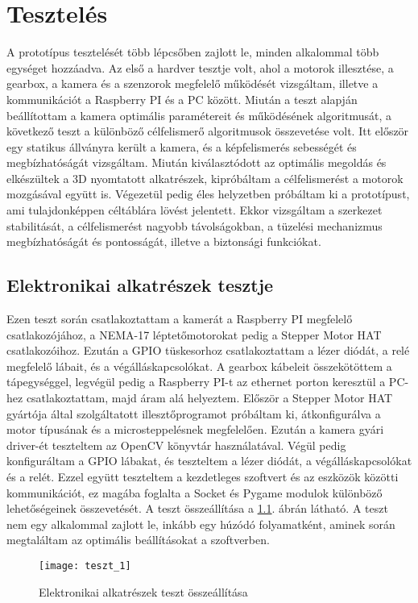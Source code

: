 \chapter{Tesztelés}
A prototípus tesztelését több lépcsőben zajlott le, minden alkalommal több egységet hozzáadva. Az első a hardver tesztje volt, ahol a motorok illesztése, a gearbox, a kamera és a szenzorok megfelelő működését vizsgáltam, illetve a kommunikációt a Raspberry PI és a PC között. Miután a teszt alapján beállítottam a kamera optimális paramétereit és működésének algoritmusát, a következő teszt a különböző célfelismerő algoritmusok összevetése volt. Itt először egy statikus állványra került a kamera, és a képfelismerés sebességét és megbízhatóságát vizsgáltam. Miután kiválasztódott az optimális megoldás és elkészültek a 3D nyomtatott alkatrészek, kipróbáltam a célfelismerést a motorok mozgásával együtt is. Végezetül pedig éles helyzetben próbáltam ki a prototípust, ami tulajdonképpen céltáblára lövést jelentett. Ekkor vizsgáltam a szerkezet stabilitását, a célfelismerést nagyobb távolságokban, a tüzelési mechanizmus megbízhatóságát és pontosságát, illetve a biztonsági funkciókat.

\section{Elektronikai alkatrészek tesztje}
Ezen teszt során csatlakoztattam a kamerát a Raspberry PI megfelelő csatlakozójához, a NEMA-17 léptetőmotorokat pedig a Stepper Motor HAT csatlakozóihoz. Ezután a GPIO tüskesorhoz csatlakoztattam a lézer diódát, a relé megfelelő lábait, és a végálláskapcsolókat. A gearbox kábeleit összekötöttem a tápegységgel, legvégül pedig a Raspberry PI-t az ethernet porton keresztül a PC-hez csatlakoztattam, majd áram alá helyeztem. Először a Stepper Motor HAT gyártója által szolgáltatott illesztőprogramot próbáltam ki, átkonfigurálva a motor típusának és a microsteppelésnek megfelelően. Ezután a kamera gyári driver-ét teszteltem az OpenCV könyvtár használatával. Végül pedig konfiguráltam a GPIO lábakat, és teszteltem a lézer diódát, a végálláskapcsolókat és a relét. Ezzel együtt teszteltem a kezdetleges szoftvert és az eszközök közötti kommunikációt, ez magába foglalta a Socket és Pygame modulok különböző lehetőségeinek összevetését. A teszt összeállítása a \ref{fig:teszt_1}. ábrán látható. A teszt nem egy alkalommal zajlott le, inkább egy húzódó folyamatként, aminek során megtaláltam az optimális beállításokat a szoftverben.

\begin{figure}[h!]
	\centering
	\texttt{[image: teszt\_1]}
	\caption{Elektronikai alkatrészek teszt összeállítása}
	\label{fig:teszt_1}
\end{figure}


